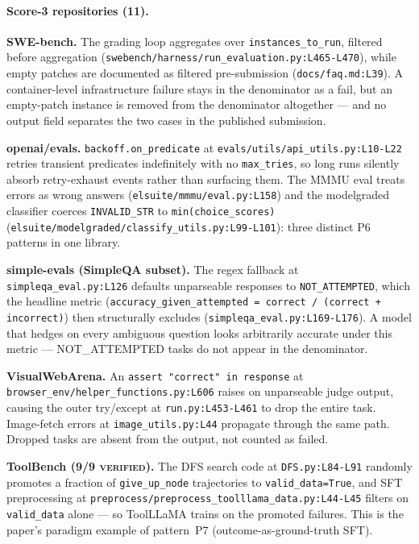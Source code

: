 \documentclass{article}
\begin{document}
\paragraph{Score-3 repositories (11).}

\textbf{SWE-bench.} The grading loop aggregates over
\texttt{instances\_to\_run}, filtered before aggregation
(\texttt{swebench/harness/run\_evaluation.py:L465-L470}), while
empty patches are documented as filtered
pre-submission (\texttt{docs/faq.md:L39}). A container-level
infrastructure failure stays in the denominator as a fail, but
an empty-patch instance is removed from the denominator
altogether --- and no output field separates the two cases in
the published submission.

\textbf{openai/evals.}
\texttt{backoff.on\_predicate} at
\texttt{evals/utils/api\_utils.py:L10-L22} retries transient
predicates indefinitely with no \texttt{max\_tries}, so long
runs silently absorb retry-exhaust events rather than surfacing
them. The MMMU eval treats errors as wrong answers
(\texttt{elsuite/mmmu/eval.py:L158}) and the modelgraded
classifier coerces \texttt{INVALID\_STR} to
\texttt{min(choice\_scores)}
(\texttt{elsuite/modelgraded/classify\_utils.py:L99-L101}):
three distinct P6 patterns in one library.

\textbf{simple-evals (SimpleQA subset).} The regex
fallback at \texttt{simpleqa\_eval.py:L126} defaults unparseable
responses to \texttt{NOT\_ATTEMPTED}, which the headline metric
(\texttt{accuracy\_given\_attempted = correct / (correct +
incorrect)}) then structurally excludes
(\texttt{simpleqa\_eval.py:L169-L176}). A model that hedges on
every ambiguous question looks arbitrarily accurate under this
metric --- NOT\_ATTEMPTED tasks do not appear in the
denominator.

\textbf{VisualWebArena.} An \texttt{assert "correct"
in response} at
\texttt{browser\_env/helper\_functions.py:L606} raises on
unparseable judge output, causing the outer try/except at
\texttt{run.py:L453-L461} to drop the entire task. Image-fetch
errors at \texttt{image\_utils.py:L44} propagate through the
same path. Dropped tasks are absent from the output, not
counted as failed.

\textbf{ToolBench (9/9 \textsc{verified}).} The DFS
search code at \texttt{DFS.py:L84-L91} randomly promotes a
fraction of \texttt{give\_up\_node} trajectories to
\texttt{valid\_data=True}, and SFT preprocessing at
\texttt{preprocess/preprocess\_toolllama\_data.py:L44-L45}
filters on \texttt{valid\_data} alone --- so ToolLLaMA trains
on the promoted failures. This is the paper's paradigm example
of pattern~P7 (outcome-as-ground-truth SFT).
\end{document}
